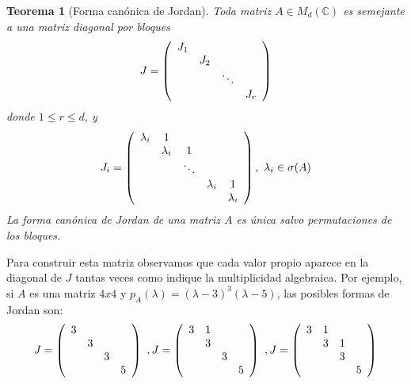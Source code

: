\documentclass[size=a4, parskip=half, titlepage=false, toc=flat, toc=bib, 12pt]{scrartcl}
\theoremstyle{theorem-style}
\newtheorem{nth}{Teorema}[section]
\theoremstyle{definition-style}
\theoremstyle{remark-style}
\theoremstyle{example-style}
\theoremstyle{definition-style}
\theoremstyle{remark-style}
\begin{document}
\begin{nth}[Forma canónica de Jordan]
Toda matriz $A \in M_d(\mathbb{C})$ es semejante a una matriz diagonal por bloques
$$J = \left(
      \begin{array}{{cccc}}
        J_1   &           &         &     \\
              &    J_2    &         &     \\
              &           & \ddots  &     \\
              &           &         & J_r
      \end{array}
\right)$$
donde $1 \leq r \leq d$, y
$$J_i = \left(
      \begin{array}{{ccccc}}
        \lambda_i   &   1       &         &    & \\
              &    \lambda_i    &    1     &    & \\
              &           & \ddots  &     & \\
              &           &         & \lambda_i & 1 \\
              &           &         &           & \lambda_i
      \end{array}
\right), \ \lambda_i \in \sigma(A)$$
La forma canónica de Jordan de una matriz $A$ es única salvo permutaciones de los bloques.
\end{nth}

Para construir esta matriz observamos que cada valor propio aparece en la diagonal de $J$ tantas veces como indique la multiplicidad algebraica. Por ejemplo, si $A$ es una matriz $4x4$ y $p_A(\lambda) = (\lambda - 3)^3 (\lambda - 5)$, las posibles formas de Jordan son:
$$J = \left(
      \begin{array}{{cccc}}
        3   &           &         &     \\
              &    3    &         &     \\
              &         & 3       &     \\
              &        &         & 5
      \end{array}
\right) \ ,  J = \left(
      \begin{array}{{cccc}}
        3   &    1      &         &     \\
            &    3      &         &     \\
            &           & 3       &     \\
            &           &         & 5
      \end{array}
\right)\ , J = \left(
      \begin{array}{{cccc}}
        3     &     1     &         &     \\
              &    3      &   1     &     \\
              &           & 3       &     \\
              &           &         & 5
      \end{array}
\right) $$
\end{document}
